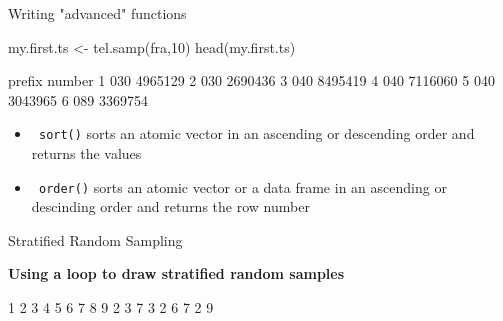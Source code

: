 \documentclass[11pt,german,hideothersubsections]{beamer}
\newcommand{\R}[1]{{\tt \color{blue}  #1}}
\begin{document}
\begin{frame}[fragile]{Writing "advanced" functions}
\footnotesize{
\begin{Schunk}
\begin{Sinput}
 my.first.ts <- tel.samp(fra,10)
 head(my.first.ts)
\end{Sinput}
\begin{Soutput}
  prefix  number
1    030 4965129
2    030 2690436
3    040 8495419
4    040 7116060
5    040 3043965
6    089 3369754
\end{Soutput}
\end{Schunk}
}

\vspace{.25cm}
\begin{itemize}
\item \R{sort()} sorts an atomic vector in an ascending or descending order and returns the values
\item \R{order()} sorts an atomic vector or a data frame in an ascending or descinding order and returns the row number
\end{itemize}
\end{frame}
\begin{frame}[fragile]{Stratified Random Sampling}
\footnotesize{
\begin{center}
\textbf{Using a loop to draw stratified random samples}
\end{center}
\begin{Schunk}
\begin{Soutput}
1 2 3 4 5 6 7 8 9 
2 3 7 3 2 6 7 2 9 
\end{Soutput}
\end{Schunk}
}
\end{frame}
\end{document}
